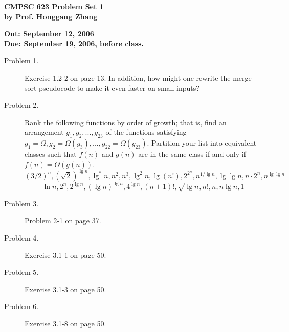 \documentclass[11pt]{article}
\begin{document}

\begin{center}
{\bf CMPSC 623 Problem Set 1} \\
{\bf by Prof. Honggang Zhang} \\
\end{center}
\begin{center}
{\bf Out: September 12, 2006} \\
{\bf Due: September 19, 2006, before class.} \\

\end{center}


\begin{description}

\item[Problem 1.]
 Exercise 1.2-2 on page 13. In addition, how might one
rewrite the merge sort pseudocode to make it even faster on small
inputs?


\item[Problem 2.] Rank the following functions by order of growth; that is,
find an arrangement $g_1, g_2, ..., g_{23}$ of the functions
satisfying $g_1=\Omega, g_2=\Omega(g_3), ...,
g_{22}=\Omega(g_{23})$. Partition your list into equivalent
classes such that $f(n)$ and $g(n)$ are in the same class if and
only if $f(n)=\Theta(g(n))$.
$$(3/2)^n, (\sqrt{2})^{\lg n}, \lg^*n, n^2, n^3, \lg^2n,
\lg (n!), 2^{2^n}, n^{1/\lg n}, \lg \lg n, n\cdot 2^n, n^{\lg \lg
n}
$$
$$
\ln n, 2^n, 2^{\lg n}, (\lg n)^{\lg n}, 4^{\lg n}, (n+1)!,
\sqrt{\lg n}, n!,  n, n\lg n, 1
$$

\item[Problem 3.] Problem 2-1 on page 37.

\item[Problem 4.] Exercise 3.1-1 on page 50.

\item[Problem 5.] Exercise 3.1-3  on page 50.
\item[Problem 6.]Exercise 3.1-8  on page 50.



\end{description}
\end{document}
